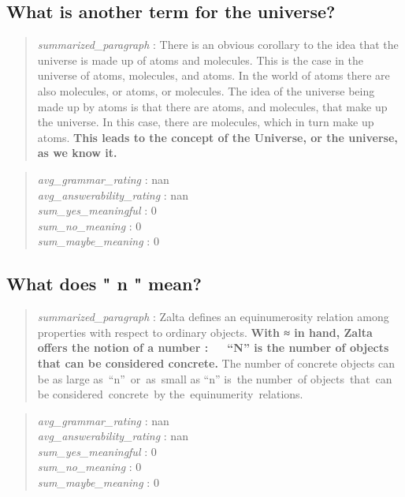 \hypertarget{what-is-another-term-for-the-universe}{%
\subsection{What is another term for the
universe?}\label{what-is-another-term-for-the-universe}}

\begin{quote}
\emph{summarized\_paragraph} : There is an obvious corollary to the idea
that the universe is made up of atoms and molecules. This is the case in
the universe of atoms, molecules, and atoms. In the world of atoms there
are also molecules, or atoms, or molecules. The idea of the universe
being made up by atoms is that there are atoms, and molecules, that make
up the universe. In this case, there are molecules, which in turn make
up atoms. \textbf{This leads to the concept of the Universe, or the
universe, as we know it.}
\end{quote}

\begin{quote}
\emph{avg\_grammar\_rating} : nan\\
\emph{avg\_answerability\_rating} : nan\\
\emph{sum\_yes\_meaningful} : 0\\
\emph{sum\_no\_meaning} : 0\\
\emph{sum\_maybe\_meaning} : 0
\end{quote}

\hypertarget{what-does-n-mean}{%
\subsection{What does " n " mean?}\label{what-does-n-mean}}

\begin{quote}
\emph{summarized\_paragraph} : Zalta defines an equinumerosity relation
among properties with respect to ordinary objects. \textbf{With ≈ in
hand, Zalta offers the notion of a number :~~~``N'' is the number of
objects that can be considered concrete.} The number of concrete objects
can be as large as~``n''~or~as~small as ``n'' is~the number~of
objects~that~can be considered~concrete~by the~equinumerity~relations.
\end{quote}

\begin{quote}
\emph{avg\_grammar\_rating} : nan\\
\emph{avg\_answerability\_rating} : nan\\
\emph{sum\_yes\_meaningful} : 0\\
\emph{sum\_no\_meaning} : 0\\
\emph{sum\_maybe\_meaning} : 0
\end{quote}

